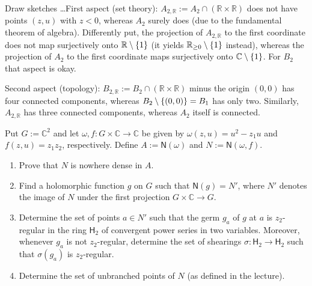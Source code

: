 \documentclass[a4paper]{amsart}
\newcommand{\C}{\mathbb{C}}
\newcommand{\R}{\mathbb{R}}
\newcommand{\Zero}[1]{\mathsf{N}(#1)}
\newcommand{\RingH}[1]{\mathsf{H}_{#1}}
\theoremstyle{remark}
\numberwithin{equation}{question}
\DeclarePairedDelimiter\set{\{}{\}}
\begin{document}
\begin{solution}
\begin{solenum}
\item Draw sketches \ldots First aspect (set theory): $A_{2,\R} := A_2 \cap (\R \times \R)$ does not have points $(z,u)$ with $z<0$, whereas $A_2$ surely does (due to the fundamental theorem of algebra). Differently put, the projection of $A_{2,\R}$ to the first coordinate does not map surjectively onto $\R \setminus \set 1$ (it yields $\R_{\ge0} \setminus \set1$ instead), whereas the projection of $A_2$ to the first coordinate maps surjectively onto $\C \setminus \set1$. For $B_2$ that aspect is okay.

Second aspect (topology): $B_{2,\R} := B_2 \cap (\R \times \R)$ minus the origin $(0,0)$ has four connected components, whereas $B_2 \setminus \set{(0,0)} = B_1$ has only two. Similarly, $A_{2,\R}$ has three connected components, whereas $A_2$ itself is connected.
\end{solenum}
\end{solution}

\begin{question}
\label{qu:unbranched points}
Put $G := \C^2$ and let $\omega,f \colon G \times \C \to \C$ be given by $\omega(z,u) = u^2 - z_1u$ and $f(z,u) = z_1z_2$, respectively. Define $A := \Zero\omega$ and $N := \Zero{\omega,f}$.
\begin{enumerate}
\item Prove that $N$ is nowhere dense in $A$.
\item Find a holomorphic function $g$ on $G$ such that $\Zero g = N'$, where $N'$ denotes the image of $N$ under the first projection $G \times \C \to G$.
\item Determine the set of points $a \in N'$ such that the germ $g_a$ of $g$ at $a$ is $z_2$-regular in the ring $\RingH2$ of convergent power series in two variables. Moreover, whenever $g_a$ is not $z_2$-regular, determine the set of shearings $\sigma \colon \RingH2 \to \RingH2$ such that $\sigma(g_a)$ is $z_2$-regular.
\item Determine the set of unbranched points of $N$ (as defined in the lecture).
\end{enumerate}
\end{question}
\end{document}
